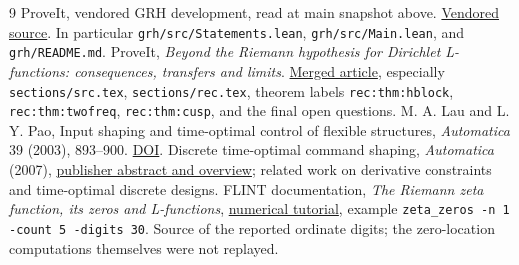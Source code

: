 \documentclass[11pt]{article}
\theoremstyle{remark}\newtheorem{remark}[theorem]{Remark}
\begin{document}
\begin{thebibliography}{9}
 ProveIt, vendored GRH development, read at main snapshot above. \href{https://github.com/VladimirReshetnikov/ProveIt/tree/a4404ca0247c31b8760589015b7eb6ab4efb6f92/Analysis/GeneralizedRiemannHypothesis/vendor/grh-lean}{Vendored source}. In particular \texttt{grh/src/Statements.lean}, \texttt{grh/src/Main.lean}, and \texttt{grh/README.md}.
 ProveIt, \emph{Beyond the Riemann hypothesis for Dirichlet L-functions: consequences, transfers and limits}. \href{https://github.com/VladimirReshetnikov/ProveIt/tree/a4404ca0247c31b8760589015b7eb6ab4efb6f92/Analysis/GeneralizedRiemannHypothesis/Article}{Merged article}, especially \texttt{sections/src.tex}, \texttt{sections/rec.tex}, theorem labels \texttt{rec:thm:hblock}, \texttt{rec:thm:twofreq}, \texttt{rec:thm:cusp}, and the final open questions.
 M. A. Lau and L. Y. Pao, Input shaping and time-optimal control of flexible structures, \emph{Automatica} 39 (2003), 893--900. \href{https://doi.org/10.1016/S0005-1098(03)00024-4}{DOI}.
 Discrete time-optimal command shaping, \emph{Automatica} (2007), \href{https://www.sciencedirect.com/science/article/abs/pii/S0005109807001264}{publisher abstract and overview}; related work on derivative constraints and time-optimal discrete designs.
 FLINT documentation, \emph{The Riemann zeta function, its zeros and L-functions}, \href{https://flintlib.org/doc/tutorials/numerics/zeta.html}{numerical tutorial}, example \texttt{zeta\_zeros -n 1 -count 5 -digits 30}. Source of the reported ordinate digits; the zero-location computations themselves were not replayed.
\end{thebibliography}
\end{document}
